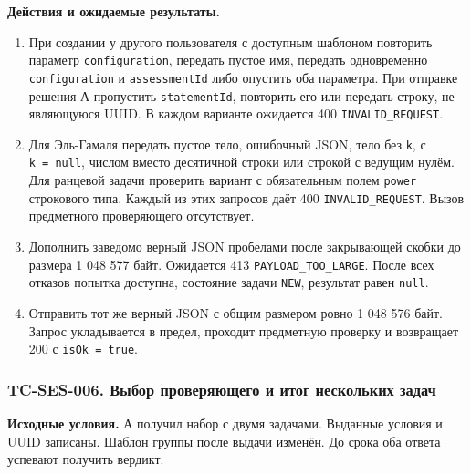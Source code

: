 \documentclass[12pt,a4paper]{article}
\newcommand{\tightlist}{\setlength{\itemsep}{0pt}\setlength{\parskip}{0pt}}
\begin{document}
\textbf{Действия и ожидаемые результаты.}

\begin{enumerate}
\def\labelenumi{\arabic{enumi}.}
\tightlist
\item
  При создании у другого пользователя с доступным шаблоном повторить параметр \texttt{configuration}, передать пустое имя, передать одновременно \texttt{configuration} и \texttt{assessment\allowbreak{}Id} либо опустить оба параметра. При отправке решения А пропустить \texttt{statement\allowbreak{}Id}, повторить его или передать строку, не являющуюся UUID. В каждом варианте ожидается 400 \texttt{INVALID\_\allowbreak{}REQUEST}.
\item
  Для Эль-Гамаля передать пустое тело, ошибочный JSON, тело без \texttt{k}, с \texttt{k\ =\ null}, числом вместо десятичной строки или строкой с ведущим нулём. Для ранцевой задачи проверить вариант с обязательным полем \texttt{power} строкового типа. Каждый из этих запросов даёт 400 \texttt{INVALID\_\allowbreak{}REQUEST}. Вызов предметного проверяющего отсутствует.
\item
  Дополнить заведомо верный JSON пробелами после закрывающей скобки до размера 1 048 577 байт. Ожидается 413 \texttt{PAYLOAD\_\allowbreak{}TOO\_\allowbreak{}LARGE}. После всех отказов попытка доступна, состояние задачи \texttt{NEW}, результат равен \texttt{null}.
\item
  Отправить тот же верный JSON с общим размером ровно 1 048 576 байт. Запрос укладывается в предел, проходит предметную проверку и возвращает 200 с \texttt{is\allowbreak{}Ok =\allowbreak{} true}.
\end{enumerate}

\subsubsection{TC-SES-006. Выбор проверяющего и итог нескольких задач}\label{tc-ses-006-ux432ux44bux431ux43eux440-ux43fux440ux43eux432ux435ux440ux44fux44eux449ux435ux433ux43e-ux438-ux438ux442ux43eux433-ux43dux435ux441ux43aux43eux43bux44cux43aux438ux445-ux437ux430ux434ux430ux447}

\hypertarget{tc-ses-006-выбор-проверяющего-и-итог-нескольких-задач}{}

\hypertarget{tc-ses-006}{}

\textbf{Исходные условия.} А получил набор с двумя задачами. Выданные условия и UUID записаны. Шаблон группы после выдачи изменён. До срока оба ответа успевают получить вердикт.
\end{document}
